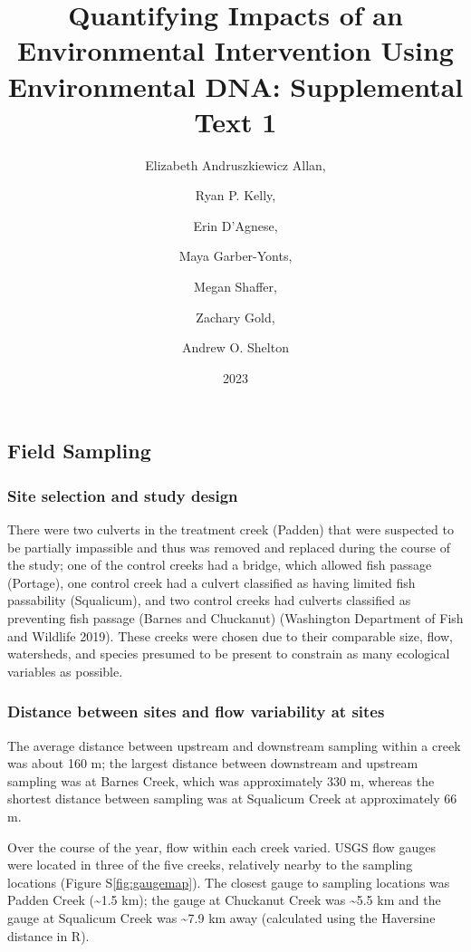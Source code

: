\documentclass[
]{article}
\title{Quantifying Impacts of an Environmental Intervention Using
Environmental DNA: Supplemental Text 1}
\author{Elizabeth Andruszkiewicz Allan, \and Ryan P. Kelly, \and Erin
D'Agnese, \and Maya Garber-Yonts, \and Megan Shaffer, \and Zachary
Gold, \and Andrew O. Shelton}
\date{2023}
\begin{document}
\maketitle

\hypertarget{field-sampling}{%
\subsection{Field Sampling}\label{field-sampling}}

\hypertarget{site-selection-and-study-design}{%
\subsubsection{Site selection and study
design}\label{site-selection-and-study-design}}

There were two culverts in the treatment creek (Padden) that were
suspected to be partially impassible and thus was removed and replaced
during the course of the study; one of the control creeks had a bridge,
which allowed fish passage (Portage), one control creek had a culvert
classified as having limited fish passability (Squalicum), and two
control creeks had culverts classified as preventing fish passage
(Barnes and Chuckanut) (Washington Department of Fish and Wildlife
2019). These creeks were chosen due to their comparable size, flow,
watersheds, and species presumed to be present to constrain as many
ecological variables as possible.

\hypertarget{distance-between-sites-and-flow-variability-at-sites}{%
\subsubsection{Distance between sites and flow variability at
sites}\label{distance-between-sites-and-flow-variability-at-sites}}

The average distance between upstream and downstream sampling within a
creek was about 160 m; the largest distance between downstream and
upstream sampling was at Barnes Creek, which was approximately 330 m,
whereas the shortest distance between sampling was at Squalicum Creek at
approximately 66 m.

Over the course of the year, flow within each creek varied. USGS flow
gauges were located in three of the five creeks, relatively nearby to
the sampling locations (Figure S\ref{fig:gaugemap}). The closest gauge
to sampling locations was Padden Creek (\textasciitilde1.5 km); the
gauge at Chuckanut Creek was \textasciitilde5.5 km and the gauge at
Squalicum Creek was \textasciitilde7.9 km away (calculated using the
Haversine distance in R).
\end{document}
